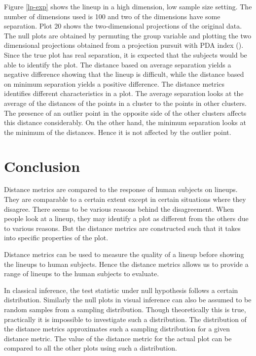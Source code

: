 \documentclass[12]{article}
\begin{document}
Figure \ref{lp-exp} shows the lineup in a high dimension, low sample size setting. The number of dimensions used is 100 and two of the dimensions have some separation. Plot 20 shows the two-dimensional projections of the original data. The null plots are obtained by permuting the group variable and plotting the two dimensional projections obtained from a projection pursuit with PDA index (\cite{lee:2009}). Since the true plot has real separation, it is expected that the subjects would be able to identify the plot. The distance based on average separation yields a negative difference showing that the lineup is difficult, while the distance based on minimum separation yields a positive difference. The distance metrics identifies different characteristics in a plot. The average separation looks at the average of the distances of the points in a cluster to the points in other clusters. The presence of an outlier point in the opposite side of the other clusters affects this distance considerably. On the other hand, the minimum separation looks at the minimum of the distances. Hence it is not affected by the outlier point. 


\section{Conclusion}

Distance metrics are compared to the response of human subjects on lineups. They are comparable to a certain extent except in certain situations where they disagree. There seems to be various reasons behind the disagreement. When people look at a lineup, they may identify a plot as different from the others due to various reasons. But the distance metrics are constructed such that it takes into specific properties of the plot. 

Distance metrics can be used to measure the quality of a lineup before showing the lineups to human subjects. Hence the distance metrics allows us to provide a range of lineups to the human subjects to evaluate.

In classical inference, the test statistic under null hypothesis follows a certain distribution. Similarly the null plots in visual inference can also be assumed to be random samples from a sampling distribution. Though theoretically this is true, practically it is impossible to investigate such a distribution. The distribution of the distance metrics approximates such a sampling distribution for a given distance metric. The value of the distance metric for the actual plot can be compared to all the other plots using such a distribution.
\end{document}
